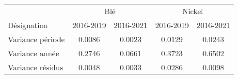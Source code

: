 \begin{tabular}{@{}lcccc@{}}
\toprule
    \multicolumn{1}{c}{} & \multicolumn{2}{c}{Blé}   & \multicolumn{2}{c}{Nickel} \\
    Désignation  & 2016-2019 & 2016-2021 & 2016-2019  & 2016-2021 \\ 
\cmidrule(r){1-1}\cmidrule(lr){2-3}\cmidrule(l){4-5}
    Variance période                         & 0.0086      & 0.0023      & 0.0129       & 0.0243      \\
    Variance année                           & 0.2746      & 0.0661      & 0.3723       & 0.6502      \\
    Variance résidus                         & 0.0048      & 0.0033      & 0.0286       & 0.0098      \\ 
\bottomrule
\end{tabular}